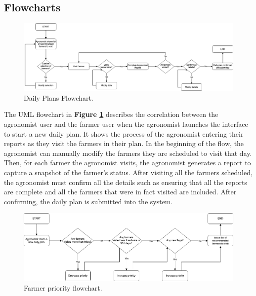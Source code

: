 \subsection{Flowcharts}


\begin{figure}[hbt!]
\centering
\includegraphics[scale=0.4]{../images_diagrams/agronomistexecutesplan.png}
\caption{\label{fig:flowAgronomistReport}Daily Plans Flowchart.}
\end{figure}

\begin{flushleft}
The UML flowchart in \textbf{Figure \ref{fig:flowAgronomistReport}} describes the correlation between the agronomist user and the farmer user when the agronomist launches the interface to start a new daily plan. It shows the process of the agronomist entering their reports as they visit the farmers in their plan. In the beginning of the flow, the agronomist can manually modify the farmers they are scheduled to visit that day. Then, for each farmer the agronomist visits, the agronomist generates a report to capture a snapshot of the farmer's status. After visiting all the farmers scheduled, the agronomist must confirm all the details such as ensuring that all the reports are complete and all the farmers that were in fact visited are included. After confirming, the daily plan is submitted into the system.
\end{flushleft}

\begin{figure}[hbt!]
\centering
\includegraphics[scale=0.4]{../images_diagrams/adjustvisitpriority.png}
\caption{\label{fig:flowPriority}Farmer priority flowchart.}
\end{figure}


